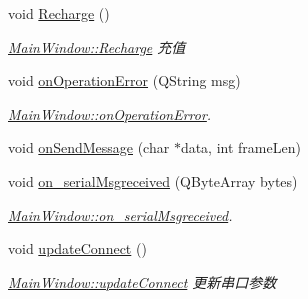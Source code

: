 \begin{DoxyCompactItemize}
void \mbox{\hyperlink{class_main_window_acfa568cdc9d07d4a8cc9e1eda8fee0e1}{Recharge}} ()
\begin{DoxyCompactList}\small\item\em \mbox{\hyperlink{class_main_window_acfa568cdc9d07d4a8cc9e1eda8fee0e1}{Main\+Window\+::\+Recharge}} 充值 \end{DoxyCompactList}\item 
void \mbox{\hyperlink{class_main_window_afa5d14c3c19a3ce9a57a63f32d7b6af5}{on\+Operation\+Error}} (Q\+String msg)
\begin{DoxyCompactList}\small\item\em \mbox{\hyperlink{class_main_window_afa5d14c3c19a3ce9a57a63f32d7b6af5}{Main\+Window\+::on\+Operation\+Error}}. \end{DoxyCompactList}\item 
void \mbox{\hyperlink{class_main_window_a18b22ec92e72eb11a50503f30dbc756d}{on\+Send\+Message}} (char $\ast$data, int frame\+Len)
\item 
void \mbox{\hyperlink{class_main_window_a13d0382dd96e94f56a05300323d278da}{on\+\_\+serial\+Msgreceived}} (Q\+Byte\+Array bytes)
\begin{DoxyCompactList}\small\item\em \mbox{\hyperlink{class_main_window_a13d0382dd96e94f56a05300323d278da}{Main\+Window\+::on\+\_\+serial\+Msgreceived}}. \end{DoxyCompactList}\item 
void \mbox{\hyperlink{class_main_window_a7fddd1ab5d3fcf4454ef1fdfd45f56a7}{update\+Connect}} ()
\begin{DoxyCompactList}\small\item\em \mbox{\hyperlink{class_main_window_a7fddd1ab5d3fcf4454ef1fdfd45f56a7}{Main\+Window\+::update\+Connect}} 更新串口参数 \end{DoxyCompactList}\end{DoxyCompactItemize}
